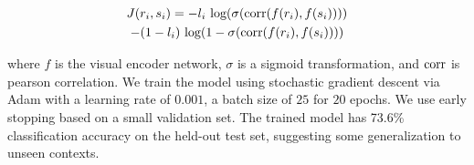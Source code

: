 \documentclass[9pt,twocolumn,twoside]{pnas-new}
\begin{document}
{\begin{multline}
    J(r_{i}, s_{i}) = -l_{i} \textup{ log}(\sigma(\textup{corr}(f(r_{i}), f(s_{i})))) \\ - (1 - l_{i}) \textup{ log}(1 - \sigma(\textup{corr}(f(r_{i}), f(s_{i}))))
\end{multline}

where $f$ is the visual encoder network, $\sigma$ is a sigmoid transformation, and $\textup{corr}$ is pearson correlation. We train the model using stochastic gradient descent via Adam with a learning rate of $0.001$, a batch size of $25$ for $20$ epochs. We use early stopping based on a small validation set. The trained model has 73.6\% classification accuracy on the held-out test set, suggesting some generalization to unseen contexts.

}

\showmatmethods{} %


\showacknow{} %



\end{document}
